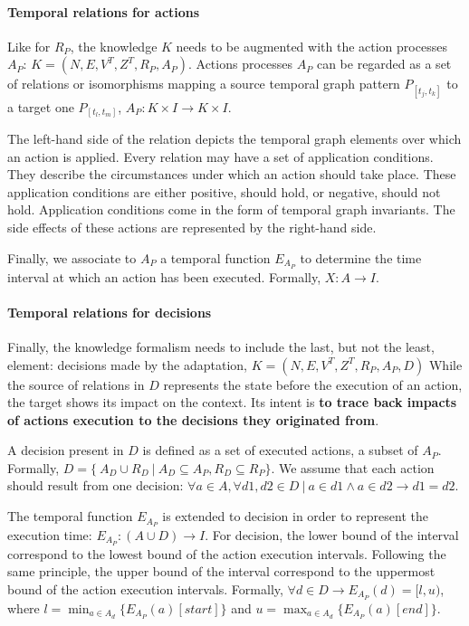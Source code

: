 \paragraph{Temporal relations for actions}
Like for $R_P$, the knowledge $K$ needs to be augmented with the action processes $A_P$: $K = (N, E, V^T, Z^T, R_P, A_P)$.
Actions processes $A_P$ can be regarded as  a set of relations or isomorphisms mapping a source temporal graph pattern $P_{[t_j, t_k]}$ to a target one $P_{[t_l, t_m]}$,  $A_P : K \times I \rightarrow K \times I$.

The left-hand side of the relation depicts the temporal graph elements over which an action is applied.
Every relation may have a set of application conditions. 
They describe the circumstances under which an action should take place. 
These application conditions are either positive, should hold, or negative, should not hold. 
Application conditions come in the form of temporal graph  invariants.  
The side effects of these actions are represented by the right-hand side. 

Finally, we associate to $A_P$ a temporal function $E_{A_P}$ to determine the time interval at which an action has been executed. 
Formally, $X: A \rightarrow I$.

\paragraph{Temporal relations for decisions}
Finally, the knowledge formalism needs to include the last, but not the least, element: decisions made by the adaptation, $K = (N, E, V^T, Z^T, R_P, A_P, D)$
While the source of relations in $D$ represents the state before the execution of an action, the target shows its impact on the \gls{context}. 
Its intent is \textbf{to trace back impacts of actions execution to the decisions they originated from}.  

A decision present in ${D}$ is defined as a set of executed actions, \ie a subset of ${A_P}$.
Formally, ${D} = \{\ {A_D \cup R_D}~|~{A_D}  \subseteq A_P, R_D \subseteq R_P\}$.
We assume that each action should result from one decision: $\forall a \in {A}, \forall d1, d2 \in {D}~|~a \in d1 \wedge a \in d2 \rightarrow d1 = d2$.

The temporal function $E_{A_P}$ is extended to decision in order to represent the execution time: $E_{A_P}: (A \cup D) \rightarrow I$.
For decision, the lower bound of the interval correspond to the lowest bound of the action execution intervals.
Following the same principle, the upper bound of the interval correspond to the uppermost bound of the action execution intervals.
Formally, $\forall d \in D \rightarrow E_{A_P}(d) = [l,u)$, where $l = \displaystyle \min_{a \in A_d} \{E_{A_P}(a)[start]\}$ and $u = \displaystyle \max_{a \in A_d} \{E_{A_P}(a)[end]\}$.

